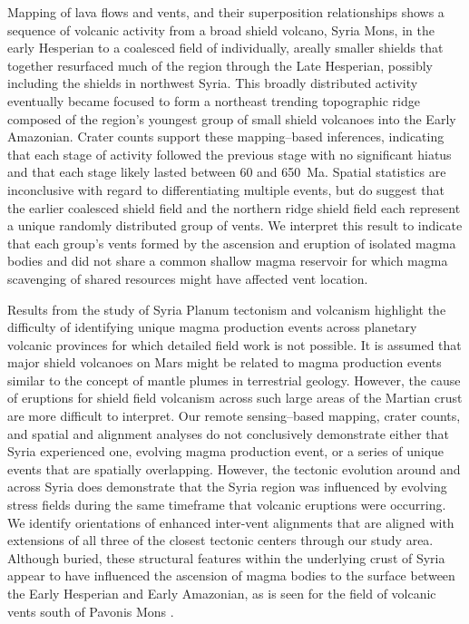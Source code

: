 \documentclass[preprint,review,authoryear,12pt]{elsarticle}
\begin{document}
Mapping of lava flows and vents, and their superposition relationships shows a sequence of volcanic activity from a broad shield volcano, Syria Mons, in the early Hesperian to a coalesced field of individually, areally smaller shields that together resurfaced much of the region through the Late Hesperian, possibly including the shields in northwest Syria.  This broadly distributed activity eventually became focused to form a northeast trending topographic ridge composed of the region's youngest group of small shield volcanoes into the Early Amazonian. Crater counts support these mapping--based inferences, indicating that each stage of activity followed the previous stage with no significant hiatus and that each stage likely lasted between 60 and 650~Ma. Spatial statistics are inconclusive with regard to differentiating multiple events, but do suggest that the earlier coalesced shield field and the northern ridge shield field each represent a unique randomly distributed group of vents. We interpret this result to indicate that each group's vents formed by the ascension and eruption of isolated magma bodies and did not share a common shallow magma reservoir for which magma scavenging of shared resources might have affected vent location.

Results from the study of Syria Planum tectonism and volcanism highlight the difficulty of identifying unique magma production events across planetary volcanic provinces for which detailed field work is not possible.  It is assumed that major shield volcanoes on Mars might be related to magma production events similar to the concept of mantle plumes in terrestrial geology. However, the cause of eruptions for shield field volcanism across such large areas of the Martian crust are more difficult to interpret. Our remote sensing--based mapping, crater counts, and spatial and alignment analyses do not conclusively demonstrate either that Syria experienced one, evolving magma production event, or a series of unique events that are spatially overlapping.  However, the tectonic evolution around and across Syria does demonstrate that the Syria region was influenced by evolving stress fields during the same timeframe that volcanic eruptions were occurring. We identify orientations of enhanced inter-vent alignments that are aligned with extensions of all three of the closest tectonic centers through our study area.  Although buried, these structural features within the underlying crust of Syria appear to have influenced the ascension of magma bodies to the surface between the Early Hesperian and Early Amazonian, as is seen for the field of volcanic vents south of Pavonis Mons \citep{Bleacher2009}.
\end{document}

